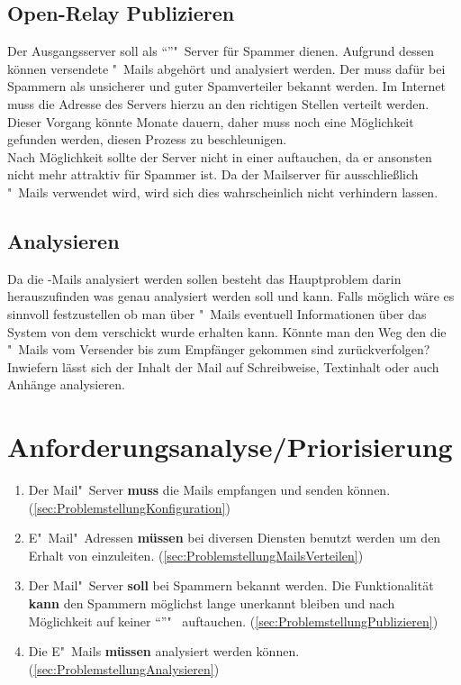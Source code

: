\documentclass[a4paper,11pt,singlespacing]{article}
\begin{document}
	\subsection{Open-Relay Publizieren}\label{sec:ProblemstellungPublizieren}
		Der Ausgangsserver soll als "`"'"~Server für Spammer dienen.
		Aufgrund dessen können versendete "~Mails abgehört und analysiert werden.
		Der  muss dafür bei Spammern als unsicherer und guter Spamverteiler bekannt werden.
		Im Internet muss die Adresse des Servers hierzu an den richtigen Stellen verteilt werden.
		Dieser Vorgang könnte Monate dauern, daher muss noch eine Möglichkeit gefunden werden, diesen Prozess zu beschleunigen.
		\\
		Nach Möglichkeit sollte der Server nicht in einer   auftauchen, da er ansonsten nicht mehr attraktiv für Spammer ist.
		Da der Mailserver für ausschließlich "~Mails verwendet wird, wird sich dies wahrscheinlich nicht verhindern lassen.

	\subsection{Analysieren}\label{sec:ProblemstellungAnalysieren}
		Da die -Mails analysiert werden sollen besteht das Hauptproblem darin herauszufinden was genau analysiert werden soll und kann.
		Falls möglich wäre es sinnvoll festzustellen ob man über "~Mails eventuell Informationen über das System von dem verschickt wurde erhalten kann.
		Könnte man den Weg den die "~Mails vom Versender bis zum Empfänger gekommen sind zurückverfolgen?
		Inwiefern lässt sich der Inhalt der Mail auf Schreibweise, Textinhalt oder auch Anhänge analysieren.




\section{Anforderungsanalyse/Priorisierung}\label{sec:AnforderungsanalysePriorisierung}
	\begin{enumerate}
	\item Der Mail"~Server \textbf{muss} die Mails empfangen und senden können. (\autoref{sec:ProblemstellungKonfiguration})
	\item E"~Mail"~Adressen \textbf{müssen} bei diversen Diensten benutzt werden um den Erhalt von  einzuleiten. (\autoref{sec:ProblemstellungMailsVerteilen})
	\item Der Mail"~Server \textbf{soll} bei Spammern bekannt werden. Die  Funktionalität \textbf{kann} den Spammern möglichst lange unerkannt bleiben und nach Möglichkeit auf keiner "`"'"~ auftauchen. (\autoref{sec:ProblemstellungPublizieren})
	\item Die E"~Mails \textbf{müssen} analysiert werden können. (\autoref{sec:ProblemstellungAnalysieren})
	\end{enumerate}
\end{document}
